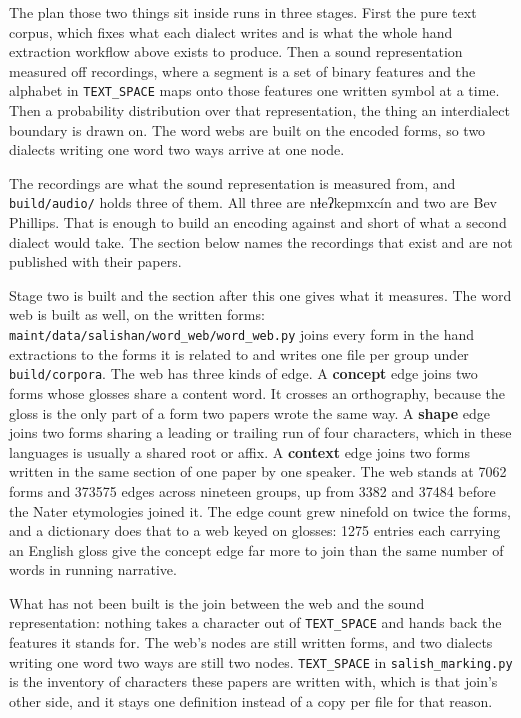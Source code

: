 The plan those two things sit inside runs in three stages. First the pure text corpus, which fixes what each dialect writes and is what the whole hand extraction workflow above exists to produce. Then a sound representation measured off recordings, where a segment is a set of binary features and the alphabet in \texttt{TEXT\_\allowbreak{}SPACE} maps onto those features one written symbol at a time. Then a probability distribution over that representation, the thing an interdialect boundary is drawn on. The word webs are built on the encoded forms, so two dialects writing one word two ways arrive at one node.

The recordings are what the sound representation is measured from, and \texttt{build/\allowbreak{}audio/\allowbreak{}} holds three of them. All three are nɬeʔkepmxcín and two are Bev Phillips. That is enough to build an encoding against and short of what a second dialect would take. The section below names the recordings that exist and are not published with their papers.

Stage two is built and the section after this one gives what it measures. The word web is built as well, on the written forms: \texttt{maint/\allowbreak{}data/\allowbreak{}salishan/\allowbreak{}word\_\allowbreak{}web/\allowbreak{}word\_\allowbreak{}web.\allowbreak{}py} joins every form in the hand extractions to the forms it is related to and writes one file per group under \texttt{build/\allowbreak{}corpora}. The web has three kinds of edge. A \textbf{concept} edge joins two forms whose glosses share a content word. It crosses an orthography, because the gloss is the only part of a form two papers wrote the same way. A \textbf{shape} edge joins two forms sharing a leading or trailing run of four characters, which in these languages is usually a shared root or affix. A \textbf{context} edge joins two forms written in the same section of one paper by one speaker. The web stands at 7062 forms and 373575 edges across nineteen groups, up from 3382 and 37484 before the Nater etymologies joined it. The edge count grew ninefold on twice the forms, and a dictionary does that to a web keyed on glosses: 1275 entries each carrying an English gloss give the concept edge far more to join than the same number of words in running narrative.

What has not been built is the join between the web and the sound representation: nothing takes a character out of \texttt{TEXT\_\allowbreak{}SPACE} and hands back the features it stands for. The web's nodes are still written forms, and two dialects writing one word two ways are still two nodes. \texttt{TEXT\_\allowbreak{}SPACE} in \texttt{salish\_\allowbreak{}marking.\allowbreak{}py} is the inventory of characters these papers are written with, which is that join's other side, and it stays one definition instead of a copy per file for that reason.

